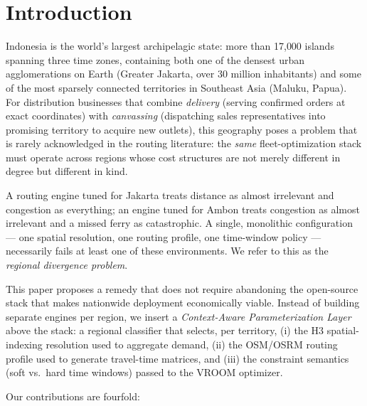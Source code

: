 \documentclass[11pt,a4paper,twocolumn]{article}
\begin{document}
\section{Introduction}
\label{sec:intro}

Indonesia is the world's largest archipelagic state: more than 17{,}000
islands spanning three time zones, containing both one of the densest urban
agglomerations on Earth (Greater Jakarta, over 30 million inhabitants) and
some of the most sparsely connected territories in Southeast Asia (Maluku,
Papua). For distribution businesses that combine \emph{delivery} (serving
confirmed orders at exact coordinates) with \emph{canvassing} (dispatching
sales representatives into promising territory to acquire new outlets), this
geography poses a problem that is rarely acknowledged in the routing
literature: the \emph{same} fleet-optimization stack must operate across
regions whose cost structures are not merely different in degree but
different in kind.

A routing engine tuned for Jakarta treats distance as almost irrelevant and
congestion as everything; an engine tuned for Ambon treats congestion as
almost irrelevant and a missed ferry as catastrophic. A single, monolithic
configuration --- one spatial resolution, one routing profile, one
time-window policy --- necessarily fails at least one of these environments.
We refer to this as the \emph{regional divergence problem}.

This paper proposes a remedy that does not require abandoning the
open-source stack that makes nationwide deployment economically viable.
Instead of building separate engines per region, we insert a
\emph{Context-Aware Parameterization Layer} above the stack: a regional
classifier that selects, per territory, (i) the H3 spatial-indexing
resolution used to aggregate demand, (ii) the OSM/OSRM routing profile used
to generate travel-time matrices, and (iii) the constraint semantics
(soft vs.\ hard time windows) passed to the VROOM optimizer.

Our contributions are fourfold:
\end{document}
